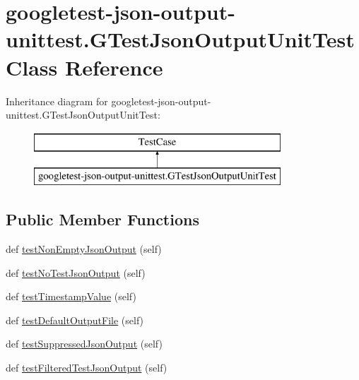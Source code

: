\hypertarget{classgoogletest-json-output-unittest_1_1GTestJsonOutputUnitTest}{}\section{googletest-\/json-\/output-\/unittest.G\+Test\+Json\+Output\+Unit\+Test Class Reference}
\label{classgoogletest-json-output-unittest_1_1GTestJsonOutputUnitTest}
Inheritance diagram for googletest-\/json-\/output-\/unittest.G\+Test\+Json\+Output\+Unit\+Test\+:\begin{figure}[H]
\begin{center}
\leavevmode
\includegraphics[height=2.000000cm]{classgoogletest-json-output-unittest_1_1GTestJsonOutputUnitTest}
\end{center}
\end{figure}
\subsection*{Public Member Functions}
\begin{DoxyCompactItemize}
\item 
def \mbox{\hyperlink{classgoogletest-json-output-unittest_1_1GTestJsonOutputUnitTest_ab5520f22133356e62a54cdb5756504bc}{test\+Non\+Empty\+Json\+Output}} (self)
\item 
def \mbox{\hyperlink{classgoogletest-json-output-unittest_1_1GTestJsonOutputUnitTest_a7da59a58c145d1c3aa2e91a6a3530cb2}{test\+No\+Test\+Json\+Output}} (self)
\item 
def \mbox{\hyperlink{classgoogletest-json-output-unittest_1_1GTestJsonOutputUnitTest_afceaa6545170996b286e610e31f2e403}{test\+Timestamp\+Value}} (self)
\item 
def \mbox{\hyperlink{classgoogletest-json-output-unittest_1_1GTestJsonOutputUnitTest_a6003d1c583fc2ded1ab5276fc82cb1c9}{test\+Default\+Output\+File}} (self)
\item 
def \mbox{\hyperlink{classgoogletest-json-output-unittest_1_1GTestJsonOutputUnitTest_aeae00520b90ff69e832cf6a676219cf8}{test\+Suppressed\+Json\+Output}} (self)
\item 
def \mbox{\hyperlink{classgoogletest-json-output-unittest_1_1GTestJsonOutputUnitTest_abc55ae0ca4d9b3d265b10bbbcc6e720e}{test\+Filtered\+Test\+Json\+Output}} (self)
\end{DoxyCompactItemize}


